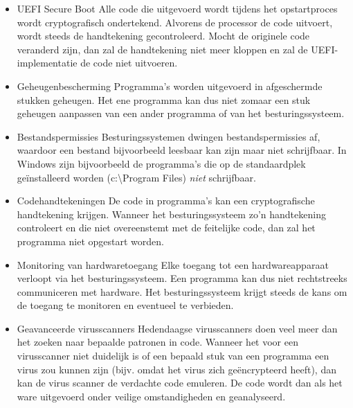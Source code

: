 \begin{itemize}
\item{UEFI Secure Boot} Alle code die uitgevoerd wordt tijdens het opstartproces wordt cryptografisch ondertekend. Alvorens de processor de code uitvoert, wordt steeds de handtekening gecontroleerd. Mocht de originele code veranderd zijn, dan zal de handtekening niet meer kloppen en zal de UEFI-implementatie de code niet uitvoeren.
\item{Geheugenbescherming} Programma's worden uitgevoerd in afgeschermde stukken geheugen. Het ene programma kan dus niet zomaar een stuk geheugen aanpassen van een ander programma of van het besturingssysteem.
\item{Bestandspermissies} Besturingssystemen dwingen bestandspermissies af, waardoor een bestand bijvoorbeeld leesbaar kan zijn maar niet schrijfbaar. In Windows zijn bijvoorbeeld de programma's die op de standaardplek ge\"installeerd worden (c:\textbackslash{}Program Files) \emph{niet} schrijfbaar.
\item{Codehandtekeningen} De code in programma's kan een cryptografische handtekening krijgen. Wanneer het besturingssysteem zo'n handtekening controleert en die niet overeenstemt met de feitelijke code, dan zal het programma niet opgestart worden.
\item{Monitoring van hardwaretoegang} Elke toegang tot een hardwareapparaat verloopt via het besturingssysteem. Een programma kan dus niet rechtstreeks communiceren met hardware. Het besturingssysteem krijgt steeds de kans om de toegang te monitoren en eventueel te verbieden.
\item{Geavanceerde virusscanners} Hedendaagse virusscanners doen veel meer dan het zoeken naar bepaalde patronen in code. Wanneer het voor een virusscanner niet duidelijk is of een bepaald stuk van een programma een virus zou kunnen zijn (bijv. omdat het virus zich ge\"encrypteerd heeft), dan kan de virus scanner de verdachte code emuleren. De code wordt dan als het ware uitgevoerd onder veilige omstandigheden en geanalyseerd.
\end{itemize} 